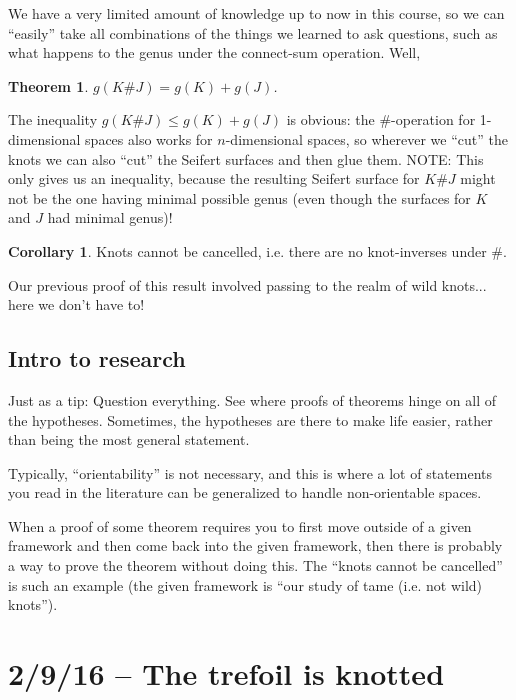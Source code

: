 \documentclass[11pt]{article}
\theoremstyle{plain}
\newtheorem{thm}{Theorem}
\theoremstyle{definition}
\newtheorem{cor}{Corollary}
\begin{document}
We have a very limited amount of knowledge up to now in this course, so we can ``easily'' take all combinations of the things we learned to ask questions, such as what happens to the genus under the connect-sum operation. Well,

\begin{thm}
$g(K\# J)=g(K)+g(J)$.
\end{thm}

The inequality $g(K\# J)\le g(K)+g(J)$ is obvious: the $\#$-operation for 1-dimensional spaces also works for $n$-dimensional spaces, so wherever we ``cut'' the knots we can also ``cut'' the Seifert surfaces and then glue them. NOTE: This only gives us an inequality, because the resulting Seifert surface for $K\#J$ might not be the one having minimal possible genus (even though the surfaces for $K$ and $J$ had minimal genus)!

\begin{cor}
Knots cannot be cancelled, i.e. there are no knot-inverses under $\#$.
\end{cor}

Our previous proof of this result involved passing to the realm of wild knots... here we don't have to!

\subsection{Intro to research}

Just as a tip: Question everything. See where proofs of theorems hinge on all of the hypotheses. Sometimes, the hypotheses are there to make life easier, rather than being the most general statement.

Typically, ``orientability'' is not necessary, and this is where a lot of statements you read in the literature can be generalized to handle non-orientable spaces.

When a proof of some theorem requires you to first move outside of a given framework and then come back into the given framework, then there is probably a way to prove the theorem without doing this. The ``knots cannot be cancelled'' is such an example (the given framework is ``our study of tame (i.e. not wild) knots'').






\clearpage
\section{2/9/16 -- The trefoil is knotted}
\end{document}
